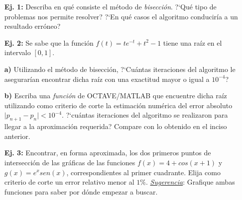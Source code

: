 \documentclass[11pt]{article}
\begin{document}
\begin{itemize}

\item[{\bf Ej. 1:}] Describa en qu\'e consiste el m\'etodo de \textit{bisecci\'on}. ?`Qu\'e tipo de problemas nos permite resolver? ?`En qu\'e casos el algoritmo conducir\'ia a un resultado err\'oneo?

\item[{\bf Ej. 2:}] Se sabe que la funci\'on $f(t)=te^{-t}+t^{2}-1$ tiene una ra\'iz en el intervalo $[0,1]$. 

\item[{\bf a)}] Utilizando el m\'etodo de bisecci\'on, ?`Cu\'antas iteraciones del algoritmo le asegurar\'ian encontrar dicha ra\'iz con una exactitud mayor o igual a $10^{-4}$?

\item[{\bf b)}] Escriba una {\it funci\'on} de OCTAVE/MATLAB que encuentre dicha ra\'iz utilizando como criterio de corte la estimaci\'on num\'erica del error absoluto $\vert p_{n+1}-p_{n}\vert < 10^{-4}$. ?`cu\'antas iteraciones del algoritmo se realizaron para llegar a la aproximaci\'on requerida? Compare con lo obtenido en el inciso anterior.


\item[{\bf Ej. 3:}] Encontrar, en forma aproximada, los dos primeros puntos de intersecci\'on de las gr\'aficas de las funciones $f(x) = 4 + cos(x+1)$ y $g(x)=e^x sen(x)$, correspondientes al primer cuadrante. Elija como criterio de corte un error relativo menor al $1\%$.
\underline{\textit{Sugerencia}}: Grafique ambas funciones para saber por d\'onde empezar a buscar.




\end{itemize}
\end{document}
